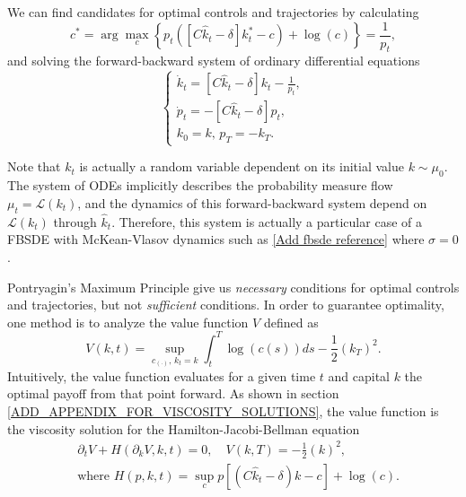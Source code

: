 \documentclass{article}
\begin{document}
We can find candidates for optimal controls and trajectories by calculating
\begin{equation*}
    c^* = \arg\max_c  \left\{ p_t\left( \left[C {\hat k_t} - \delta \right]k^*_t - c \right) + \log(c) \right\} = \frac{1}{p_t},
\end{equation*}
and solving the forward-backward system of ordinary differential equations
\begin{equation}\label{economic_example:ode_formulation}
    \begin{cases}
         \dot k_t = \left[ C {\hat k_t} - \delta \right] k_t - \frac{1}{p_t},\\
         \dot p_t = -  \left[C{\hat k_t} - \delta \right] p_t, \\
         k_0 = k,\, p_T =  - k_T.         
    \end{cases}
\end{equation}
\begin{remark}
    Note that $k_t$ is actually a random variable dependent on its initial value $k\sim \mu_0$.
    The system of ODEs implicitly describes the probability measure flow $\mu_t = \mathcal{L}(k_t)$,
    and the dynamics of this forward-backward system depend on $\mathcal{L}(k_t)$ through $\hat k_t$.
    Therefore, this system is actually a particular case of a FBSDE with McKean-Vlasov dynamics such as
    \ref{Add fbsde reference} where $\sigma = 0$.
\end{remark}
    Pontryagin's Maximum Principle give us \textit{necessary} conditions for optimal controls and trajectories, but not \textit{sufficient} conditions.
    In order to guarantee optimality, one method is to analyze the value function $V$ defined as
\begin{equation}\label{economic_example:value_function_definition}
    V(k,t) = \sup_{c_{(\cdot)},\, k_t = k} \int_t^T \log(c(s)) ds -\frac{1}{2}(k_T)^2.
\end{equation}
Intuitively, the value function evaluates for a given time $t$ and capital $k$ the optimal payoff from that point forward.
As shown in section \ref{ADD_APPENDIX_FOR_VISCOSITY_SOLUTIONS}, the value function is the viscosity solution for the Hamilton-Jacobi-Bellman equation
\begin{equation}\label{economic_example:hjb_equation_reduced}
    \begin{split}
        &\partial_t V + H(\partial_k V, k,t) = 0,\quad V(k,T) = -\frac{1}{2}(k)^2,\\
        &\text{where }
        H(p,k,t) = \sup_{c} p\left[ \left(C {\hat k_t - \delta}\right)k - c \right] + \log(c).
    \end{split}
\end{equation}
\end{document}
